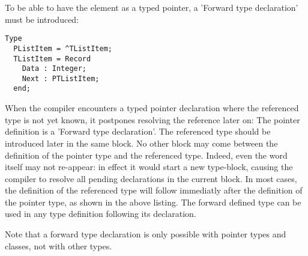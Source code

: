 To be able to have the  element as a typed pointer, a 'Forward
type declaration' must be introduced:
\begin{verbatim}
Type
  PListItem = ^TListItem;
  TListItem = Record
    Data : Integer;
    Next : PTListItem;
  end;
\end{verbatim}  
When the compiler encounters a typed pointer declaration where the
referenced type is not yet known, it postpones resolving the reference later
on: The pointer definition is a 'Forward type declaration'. The referenced
type should be introduced later in the same  block. No other block
may come between the definition of the pointer type and the referenced type.
Indeed, even the word  itself may not re-appear: in effect it
would start a new type-block, causing the compiler to resolve all pending
declarations in the current block. In most cases, the definition of the
referenced type will follow immediatly after the definition of the pointer
type, as shown in the above listing. The forward defined type can be used in
any type definition following its declaration.

Note that a forward type declaration is only possible with pointer types and
classes, not with other types.

